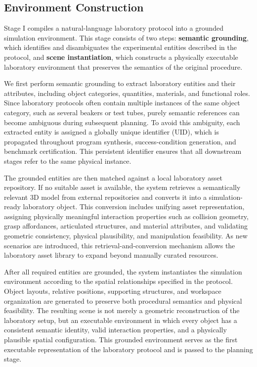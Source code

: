 \documentclass[sigconf]{acmart}
\begin{document}
\subsection{Environment Construction}
\label{sec:environment-construction}

Stage I compiles a natural-language laboratory protocol into a grounded simulation environment. This stage consists of two steps: \textbf{semantic grounding}, which identifies and disambiguates the experimental entities described in the protocol, and \textbf{scene instantiation}, which constructs a physically executable laboratory environment that preserves the semantics of the original procedure.

We first perform semantic grounding to extract laboratory entities and their attributes, including object categories, quantities, materials, and functional roles. Since laboratory protocols often contain multiple instances of the same object category, such as several beakers or test tubes, purely semantic references can become ambiguous during subsequent planning. To avoid this ambiguity, each extracted entity is assigned a globally unique identifier (UID), which is propagated throughout program synthesis, success-condition generation, and benchmark certification. This persistent identifier ensures that all downstream stages refer to the same physical instance.

The grounded entities are then matched against a local laboratory asset repository. If no suitable asset is available, the system retrieves a semantically relevant 3D model from external repositories and converts it into a simulation-ready laboratory object. This conversion includes unifying asset representation, assigning physically meaningful interaction properties such as collision geometry, grasp affordances, articulated structures, and material attributes, and validating geometric consistency, physical plausibility, and manipulation feasibility. As new scenarios are introduced, this retrieval-and-conversion mechanism allows the laboratory asset library to expand beyond manually curated resources.

After all required entities are grounded, the system instantiates the simulation environment according to the spatial relationships specified in the protocol. Object layouts, relative positions, supporting structures, and workspace organization are generated to preserve both procedural semantics and physical feasibility. The resulting scene is not merely a geometric reconstruction of the laboratory setup, but an executable environment in which every object has a consistent semantic identity, valid interaction properties, and a physically plausible spatial configuration. This grounded environment serves as the first executable representation of the laboratory protocol and is passed to the planning stage.
\end{document}
